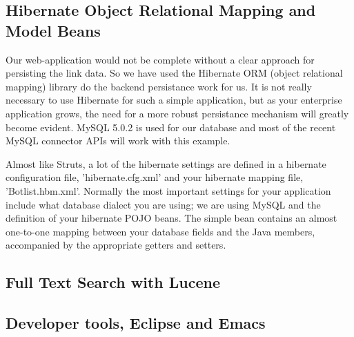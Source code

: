 \subsection{Hibernate Object Relational Mapping and Model Beans}

Our web-application would not be complete without a clear approach 
for persisting the link data. So we have used the Hibernate ORM 
(object relational mapping) library do the backend persistance work for us. 
It is not really necessary to use Hibernate for such a simple 
application, but as your enterprise application grows, 
the need for a more robust persistance mechanism will greatly become evident. 
MySQL 5.0.2 is used for our database and most of the recent 
MySQL connector APIs will work with this example.

Almost like Struts, a lot of the hibernate settings 
are defined in a hibernate configuration file, 'hibernate.cfg.xml' 
and your hibernate mapping file, 'Botlist.hbm.xml'. 
Normally the most important settings for your application 
include what database dialect you are using; we are using MySQL 
and the definition of your hibernate POJO beans. 
The simple bean contains an almost one-to-one mapping between 
your database fields and the Java members, accompanied by 
the appropriate getters and setters.

\subsection{Full Text Search with Lucene}

\subsection{Developer tools, Eclipse and Emacs}


